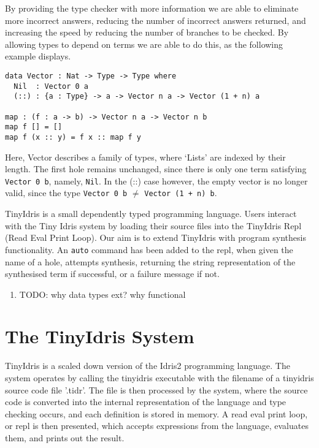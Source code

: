 \documentclass[a4paper]{article}
\begin{document}
By providing the type checker with more information we are able to eliminate more incorrect answers, 
reducing the number of incorrect answers returned, and increasing the speed by reducing the number of branches
to be checked. By allowing types to depend on terms we are able to do this, as the following example displays.

\begin{center}
\begin{verbatim}
data Vector : Nat -> Type -> Type where
  Nil  : Vector 0 a
  (::) : {a : Type} -> a -> Vector n a -> Vector (1 + n) a

map : (f : a -> b) -> Vector n a -> Vector n b
map f [] = []
map f (x :: y) = f x :: map f y
\end{verbatim}
\end{center}

Here, Vector describes a family of types, where `Lists' are indexed by their length. 
The first hole remains unchanged, since there is only one term satisfying \texttt{Vector 0 b}, namely, \texttt{Nil}.
In the (::) case however, the empty vector is no longer valid, since the type \texttt{Vector 0 b} \(\neq\) \texttt{Vector (1 + n) b}. 

TinyIdris is a small dependently typed programming language.
Users interact with the Tiny Idris system by loading their source files into the TinyIdris Repl
(Read Eval Print Loop). Our aim is to extend TinyIdris with program synthesis functionality.
An \texttt{auto} command has been added to the repl, when given the name of a hole, attempts synthesis,
returning the string representation of the synthesised term if successful, or a failure message if not.

\begin{enumerate}
\item TODO: why data types ext? why functional
\label{sec:org623b4ba}

\clearpage
\end{enumerate}

\section{The TinyIdris System}
\label{sec:orgcc0b02c}

TinyIdris is a scaled down version of the Idris2 programming language. 
The system operates by calling the tinyidris executable with the 
filename of a tinyidris source code file '.tidr'. The file is then 
processed by the system, where the source code is converted into the 
internal representation of the language and type checking occurs,
and each definition is stored in memory. A read eval print loop,
or repl is then presented, which accepts expressions from the language,
evaluates them, and prints out the result. 
\end{document}
